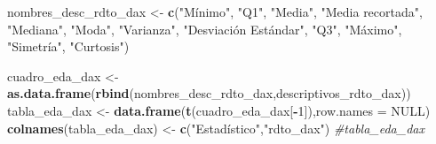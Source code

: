 \documentclass[
  11pt,
]{article}
\newenvironment{Shaded}{\begin{snugshade}}{\end{snugshade}}
\newcommand{\CommentTok}[1]{\textcolor[rgb]{0.56,0.35,0.01}{\textit{#1}}}
\newcommand{\DataTypeTok}[1]{\textcolor[rgb]{0.13,0.29,0.53}{#1}}
\newcommand{\DecValTok}[1]{\textcolor[rgb]{0.00,0.00,0.81}{#1}}
\newcommand{\KeywordTok}[1]{\textcolor[rgb]{0.13,0.29,0.53}{\textbf{#1}}}
\newcommand{\NormalTok}[1]{#1}
\newcommand{\OperatorTok}[1]{\textcolor[rgb]{0.81,0.36,0.00}{\textbf{#1}}}
\newcommand{\OtherTok}[1]{\textcolor[rgb]{0.56,0.35,0.01}{#1}}
\newcommand{\StringTok}[1]{\textcolor[rgb]{0.31,0.60,0.02}{#1}}
\begin{document}
\begin{Shaded}
\begin{Highlighting}[]
\NormalTok{nombres_desc_rdto_dax <-}\StringTok{ }\KeywordTok{c}\NormalTok{(}\StringTok{"Mínimo"}\NormalTok{, }\StringTok{"Q1"}\NormalTok{, }\StringTok{"Media"}\NormalTok{, }\StringTok{"Media recortada"}\NormalTok{, }\StringTok{"Mediana"}\NormalTok{, }\StringTok{"Moda"}\NormalTok{,}
             \StringTok{"Varianza"}\NormalTok{, }\StringTok{"Desviación Estándar"}\NormalTok{, }\StringTok{"Q3"}\NormalTok{, }\StringTok{"Máximo"}\NormalTok{, }\StringTok{"Simetría"}\NormalTok{, }\StringTok{"Curtosis"}\NormalTok{)}

\NormalTok{cuadro_eda_dax <-}\StringTok{ }\KeywordTok{as.data.frame}\NormalTok{(}\KeywordTok{rbind}\NormalTok{(nombres_desc_rdto_dax,descriptivos_rdto_dax))}
\NormalTok{tabla_eda_dax <-}\StringTok{ }\KeywordTok{data.frame}\NormalTok{(}\KeywordTok{t}\NormalTok{(cuadro_eda_dax[}\OperatorTok{-}\DecValTok{1}\NormalTok{]),}\DataTypeTok{row.names =} \OtherTok{NULL}\NormalTok{)}
\KeywordTok{colnames}\NormalTok{(tabla_eda_dax) <-}\StringTok{ }\KeywordTok{c}\NormalTok{(}\StringTok{"Estadístico"}\NormalTok{,}\StringTok{"rdto_dax"}\NormalTok{)}
\CommentTok{#tabla_eda_dax}
\end{Highlighting}
\end{Shaded}

\begin{Shaded}
\end{Shaded}
\end{document}
